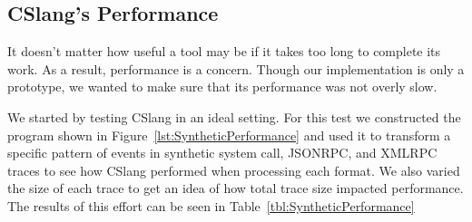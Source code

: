 %
%
%
%


\subsection{CSlang's Performance}

It doesn't matter how useful a tool may be
if it takes too long to complete its work.
As a result, performance is a concern.  Though our implementation is
only a prototype, we wanted to make sure that its performance was not
overly slow.

We started by testing
CSlang
in an ideal setting.  For this test we constructed the program
shown in Figure~\ref{lst:SyntheticPerformance}
and used it to transform a specific
pattern of events in synthetic system call, JSONRPC, and XMLRPC traces to
see how CSlang performed when processing each format.  We also varied the
size of each trace to get an idea of how total trace size impacted
performance.  The results of this effort can be seen in
Table~\ref{tbl:SyntheticPerformance}

